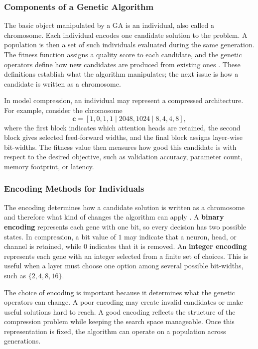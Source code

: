 \subsubsection{Components of a Genetic Algorithm}

The basic object manipulated by a GA is an individual, also called a chromosome. Each individual encodes one candidate solution to the problem. A population is then a set of such individuals evaluated during the same generation. The fitness function assigns a quality score to each candidate, and the genetic operators define how new candidates are produced from existing ones \cite{goldberg1989genetic,michalewicz1996genetic}. These definitions establish what the algorithm manipulates; the next issue is how a candidate is written as a chromosome.

In model compression, an individual may represent a compressed architecture. For example, consider the chromosome
\begin{equation}
	\mathbf{c} = [1,0,1,1 \mid 2048,1024 \mid 8,4,4,8],
\end{equation}
where the first block indicates which attention heads are retained, the second block gives selected feed-forward widths, and the final block assigns layer-wise bit-widths. The fitness value then measures how good this candidate is with respect to the desired objective, such as validation accuracy, parameter count, memory footprint, or latency.

\subsubsection{Encoding Methods for Individuals}

The encoding determines how a candidate solution is written as a chromosome and therefore what kind of changes the algorithm can apply \cite{michalewicz1996genetic}. A \textbf{binary encoding} represents each gene with one bit, so every decision has two possible states. In compression, a bit value of $1$ may indicate that a neuron, head, or channel is retained, while $0$ indicates that it is removed. An \textbf{integer encoding} represents each gene with an integer selected from a finite set of choices. This is useful when a layer must choose one option among several possible bit-widths, such as $\{2,4,8,16\}$.

The choice of encoding is important because it determines what the genetic operators can change. A poor encoding may create invalid candidates or make useful solutions hard to reach. A good encoding reflects the structure of the compression problem while keeping the search space manageable. Once this representation is fixed, the algorithm can operate on a population across generations.

